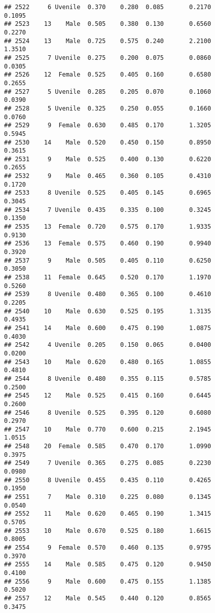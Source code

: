 \documentclass[
]{article}
\begin{document}
\begin{verbatim}
## 2522     6 Uvenile  0.370    0.280  0.085       0.2170         0.1095
## 2523    13    Male  0.505    0.380  0.130       0.6560         0.2270
## 2524    13    Male  0.725    0.575  0.240       2.2100         1.3510
## 2525     7 Uvenile  0.275    0.200  0.075       0.0860         0.0305
## 2526    12  Female  0.525    0.405  0.160       0.6580         0.2655
## 2527     5 Uvenile  0.285    0.205  0.070       0.1060         0.0390
## 2528     5 Uvenile  0.325    0.250  0.055       0.1660         0.0760
## 2529     9  Female  0.630    0.485  0.170       1.3205         0.5945
## 2530    14    Male  0.520    0.450  0.150       0.8950         0.3615
## 2531     9    Male  0.525    0.400  0.130       0.6220         0.2655
## 2532     9    Male  0.465    0.360  0.105       0.4310         0.1720
## 2533     8 Uvenile  0.525    0.405  0.145       0.6965         0.3045
## 2534     7 Uvenile  0.435    0.335  0.100       0.3245         0.1350
## 2535    13  Female  0.720    0.575  0.170       1.9335         0.9130
## 2536    13  Female  0.575    0.460  0.190       0.9940         0.3920
## 2537     9    Male  0.505    0.405  0.110       0.6250         0.3050
## 2538    11  Female  0.645    0.520  0.170       1.1970         0.5260
## 2539     8 Uvenile  0.480    0.365  0.100       0.4610         0.2205
## 2540    10    Male  0.630    0.525  0.195       1.3135         0.4935
## 2541    14    Male  0.600    0.475  0.190       1.0875         0.4030
## 2542     4 Uvenile  0.205    0.150  0.065       0.0400         0.0200
## 2543    10    Male  0.620    0.480  0.165       1.0855         0.4810
## 2544     8 Uvenile  0.480    0.355  0.115       0.5785         0.2500
## 2545    12    Male  0.525    0.415  0.160       0.6445         0.2600
## 2546     8 Uvenile  0.525    0.395  0.120       0.6080         0.2970
## 2547    10    Male  0.770    0.600  0.215       2.1945         1.0515
## 2548    20  Female  0.585    0.470  0.170       1.0990         0.3975
## 2549     7 Uvenile  0.365    0.275  0.085       0.2230         0.0980
## 2550     8 Uvenile  0.455    0.435  0.110       0.4265         0.1950
## 2551     7    Male  0.310    0.225  0.080       0.1345         0.0540
## 2552    11    Male  0.620    0.465  0.190       1.3415         0.5705
## 2553    10    Male  0.670    0.525  0.180       1.6615         0.8005
## 2554     9  Female  0.570    0.460  0.135       0.9795         0.3970
## 2555    14    Male  0.585    0.475  0.120       0.9450         0.4100
## 2556     9    Male  0.600    0.475  0.155       1.1385         0.5020
## 2557    12    Male  0.545    0.440  0.120       0.8565         0.3475

\end{verbatim}
\end{document}
